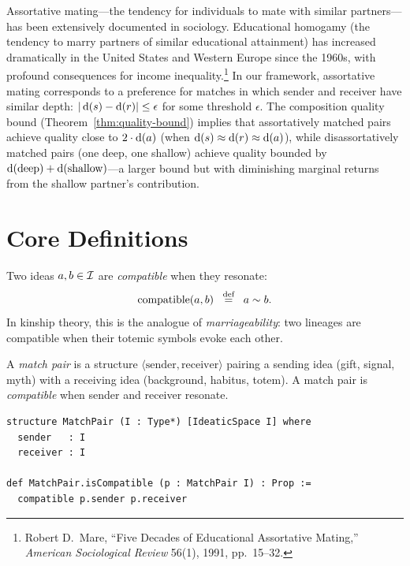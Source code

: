 Assortative mating---the tendency for individuals to mate with similar
partners---has been extensively documented in sociology.  Educational
homogamy (the tendency to marry partners of similar educational attainment)
has increased dramatically in the United States and Western Europe since
the 1960s, with profound consequences for income inequality.\footnote{Robert
D.\ Mare, ``Five Decades of Educational Assortative Mating,''
\textit{American Sociological Review} 56(1), 1991, pp.\ 15--32.}
In our framework, assortative mating corresponds to a preference for
matches in which sender and receiver have similar depth:
$|\operatorname{d}(s) - \operatorname{d}(r)| \le \epsilon$ for some threshold $\epsilon$.
The composition quality bound (Theorem~\ref{thm:quality-bound}) implies
that assortatively matched pairs achieve quality close to
$2 \cdot \operatorname{d}(a)$ (when $\operatorname{d}(s) \approx \operatorname{d}(r) \approx \operatorname{d}(a)$),
while disassortatively matched pairs (one deep, one shallow) achieve
quality bounded by $\operatorname{d}(\text{deep}) + \operatorname{d}(\text{shallow})$---a
larger bound but with diminishing marginal returns from the shallow
partner's contribution.

\section{Core Definitions}
\label{sec:ch12-defs}

\begin{definition}[Compatibility]
\label{def:compatible}
Two ideas $a, b \in \mathcal{I}$ are \emph{compatible} when they resonate:
\[
  \operatorname{compatible}(a, b)
  \;\;\stackrel{\text{def}}{=}\;\;
  a \sim b.
\]
In kinship theory, this is the analogue of \emph{marriageability}: two
lineages are compatible when their totemic symbols evoke each other.
\end{definition}

\begin{definition}
\label{def:match-pair}
A \emph{match pair} is a structure $\langle \text{sender}, \text{receiver} \rangle$
pairing a sending idea (gift, signal, myth) with a receiving idea (background,
habitus, totem).  A match pair is \emph{compatible} when sender and receiver
resonate.
\end{definition}

\begin{lstlisting}[caption={MatchPair structure in Lean~4}]
structure MatchPair (I : Type*) [IdeaticSpace I] where
  sender   : I
  receiver : I

def MatchPair.isCompatible (p : MatchPair I) : Prop :=
  compatible p.sender p.receiver
\end{lstlisting}

